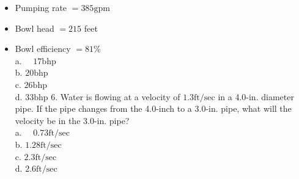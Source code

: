 \documentclass[10pt]{article}
\begin{document}
\begin{itemize}
  \item Pumping rate $=385 \mathrm{gpm}$

  \item Bowl head $=215$ feet

  \item Bowl efficiency $=81 \%$\\
a. $\quad 17 \mathrm{bhp}$\\
b. $20 \mathrm{bhp}$\\
c. $26 \mathrm{bhp}$\\
d. $33 \mathrm{bhp}$ 6. Water is flowing at a velocity of $1.3 \mathrm{ft} / \mathrm{sec}$ in a 4.0-in. diameter pipe. If the pipe changes from the 4.0-inch to a 3.0-in. pipe, what will the velocity be in the 3.0-in. pipe?\\
a. $\quad 0.73 \mathrm{ft} / \mathrm{sec}$\\
b. $1.28 \mathrm{ft} / \mathrm{sec}$\\
c. $2.3 \mathrm{ft} / \mathrm{sec}$\\
d. $2.6 \mathrm{ft} / \mathrm{sec}$

\end{itemize}
\end{document}
